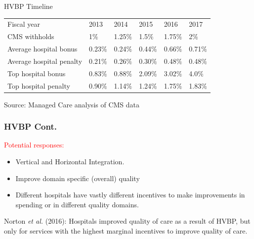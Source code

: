 \documentclass[ucs,9pt]{beamer}
\begin{document}
\begin{frame}{HVBP Timeline}
\begin{table}
\centering
\begin{tabular}{llllll}
\hline \hline
Fiscal year   &	2013  &	2014  &	2015  &	2016	  &2017 \\
CMS withholds   &	1$\%$	  &1.25$\%$  &	1.5$\%$	  &1.75$\%$  &	2$\%$ \\
Average hospital bonus &	0.23$\%$	&	0.24$\%$	&	0.44$\%$	&	0.66$\%$	&	0.71$\%$ \\
Average hospital penalty &	0.21$\%$&		0.26$\%$	&	0.30$\%$&		0.48$\%$	&	0.48$\%$\\
Top hospital bonus &	0.83$\%$&		0.88$\%$	&	2.09$\%$&		3.02$\%$	&	4.0$\%$\\
Top hospital penalty &		0.90$\%$&		1.14$\%$	&	1.24$\%$&		1.75$\%$	&	1.83$\%$\\
\hline
\end{tabular}
\end{table}
\tiny Source: Managed Care analysis of CMS data
\end{frame}




\begin{frame}
\frametitle{HVBP Cont.}
\textcolor{red}{Potential responses:}
\begin{itemize}
\item Vertical and Horizontal Integration.
\item Improve domain specific (overall) quality
\item Different hospitals have vastly different incentives to make improvements in spending or in different quality domains.
\end{itemize}
Norton \textit{et al.} (2016): Hospitals improved quality of care as a result of HVBP, but only for services with the highest marginal incentives to improve quality of care.  
\end{frame}








\end{document}
